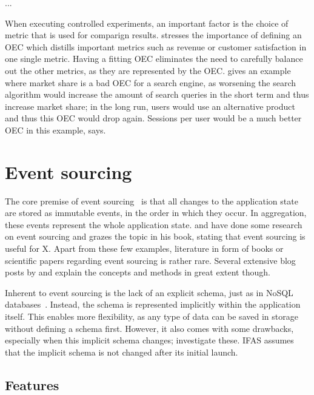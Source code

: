 ...

When executing controlled experiments, an important factor is the choice of metric that is used for comparign results.
\citet{Kohavi2013a} stresses the importance of defining an \ac{OEC} which distills important metrics such as revenue or customer satisfaction in one single metric.
Having a fitting \ac{OEC} eliminates the need to carefully balance out the other metrics, as they are represented by the \ac{OEC}.
\citeauthor{Kohavi2013a} gives an example where market share is a bad \ac{OEC} for a search engine, as worsening the search algorithm would increase the amount of search queries in the short term and thus increase market share; in the long run, users would use an alternative product and thus this \ac{OEC} would drop again.
Sessions per user would be a much better \ac{OEC} in this example, \citeauthor{Kohavi2013a} says.


\section{Event sourcing}
\label{sec:fundamentals:event}

The core premise of event sourcing~\cite{WEB:Fowler:2005} is that all changes to the application state are stored as immutable events, in the order in which they occur.
In aggregation, these events represent the whole application state.
\citet{Overeem2017} and \citet{Erb2016} have done some research on event sourcing and \citet{evans2004domain} grazes the topic in his book, stating that event sourcing is useful for X.
Apart from these few examples, literature in form of books or scientific papers regarding event sourcing is rather rare.
Several extensive blog posts by \citet{WEB:Fowler:2005} and \citet{young2010whyeventsourcing} explain the concepts and methods in great extent though.

Inherent to event sourcing is the lack of an explicit schema, just as in NoSQL databases~\cite{fowler2013schemaless}.
Instead, the schema is represented implicitly within the application itself.
This enables more flexibility, as any type of data can be saved in storage without defining a schema first.
However, it also comes with some drawbacks, especially when this implicit schema changes; \citet{Overeem2017} investigate these.
\ac{IFAS} assumes that the implicit schema is not changed after its initial launch.

\subsection{Features}

